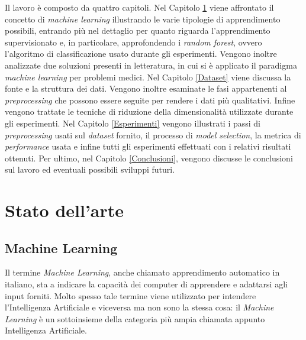\documentclass[12pt,italian]{report}
\begin{document}
	Il lavoro è composto da quattro capitoli. Nel Capitolo \ref{statoArte} viene affrontato il concetto di \textit{machine learning} illustrando le varie tipologie di apprendimento possibili, entrando più nel dettaglio per quanto riguarda l'apprendimento supervisionato e, in particolare, approfondendo i \textit{random forest}, ovvero l'algoritmo di classificazione usato durante gli esperimenti. Vengono inoltre analizzate due soluzioni presenti in letteratura, in cui si è applicato il paradigma \textit{machine learning} per problemi medici.
	Nel Capitolo \ref{Dataset} viene discussa la fonte e la struttura dei dati. Vengono inoltre esaminate le fasi appartenenti al \textit{preprocessing} che possono essere seguite per rendere i dati più qualitativi. Infine vengono trattate le tecniche di riduzione della dimensionalità utilizzate durante gli esperimenti. 
	Nel Capitolo \ref{Esperimenti} vengono illustrati i passi di \textit{preprocessing} usati sul \textit{dataset} fornito, il processo di \textit{model selection}, la metrica di \textit{performance} usata e infine tutti gli esperimenti effettuati con i relativi risultati ottenuti.
	Per ultimo, nel Capitolo \ref{Conclusioni}, vengono discusse le conclusioni sul lavoro ed eventuali possibili sviluppi futuri.
	
	\chapter{Stato dell'arte}
	\label{statoArte}
	\section{Machine Learning}
	Il termine \textit{Machine Learning}, anche chiamato apprendimento automatico in italiano, sta a indicare la capacità dei computer di apprendere e adattarsi agli input forniti.
	Molto spesso tale termine viene utilizzato per intendere l'Intelligenza Artificiale e viceversa ma non sono la stessa cosa: il \textit{Machine Learning} è un sottoinsieme della categoria più ampia chiamata appunto Intelligenza Artificiale.
 
\end{document}
